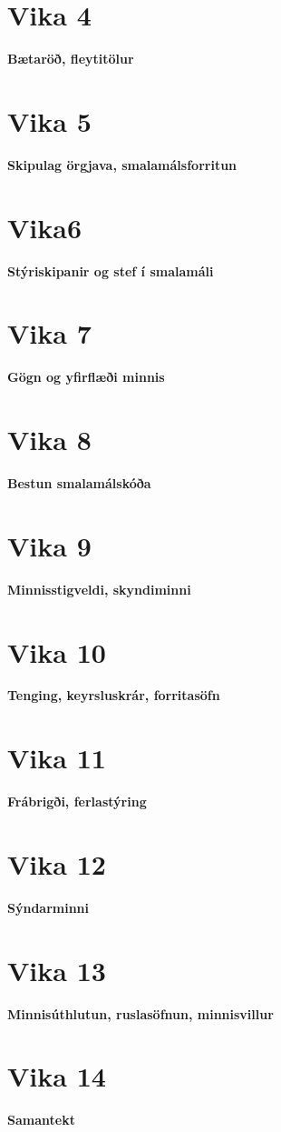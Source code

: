 \documentclass{article}
\begin{document}
\newpage
\section{Vika 4}
\large{\textbf{Bætaröð, fleytitölur}}

\newpage
\section{Vika 5}
\large{\textbf{Skipulag örgjava, smalamálsforritun}}

\newpage
\section{Vika6}
\large{\textbf{Stýriskipanir og stef í smalamáli}}

\newpage
\section{Vika 7}
\large{\textbf{Gögn og yfirflæði minnis}}

\newpage
\section{Vika 8}
\large{\textbf{Bestun smalamálskóða}}

\newpage
\section{Vika 9}
\large{\textbf{Minnisstigveldi, skyndiminni}}

\newpage
\section{Vika 10}
\large{\textbf{Tenging, keyrsluskrár, forritasöfn}}

\newpage
\section{Vika 11}
\large{\textbf{Frábrigði, ferlastýring}}

\newpage
\section{Vika 12}
\large{\textbf{Sýndarminni}}

\newpage
\section{Vika 13}
\large{\textbf{Minnisúthlutun, ruslasöfnun, minnisvillur}}

\newpage
\section{Vika 14}
\large{\textbf{Samantekt}}
\end{document}
